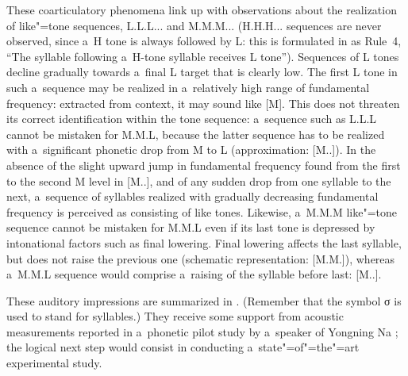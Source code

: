 These coarticulatory phenomena link up with observations about the realization of like"=tone sequences, L.L.L... and
M.M.M... (H.H.H... sequences are never observed, since a~H tone is always followed by L: this is formulated in  as Rule~4, “The syllable following a~H-tone syllable receives L tone”). Sequences
of L tones decline gradually towards a~final L target that is clearly low. The first L tone in such
a~sequence may be realized in a~relatively high range of fundamental frequency: extracted from
context, it may sound like [M]. This does not threaten its correct identification within the tone
sequence: a~sequence such as L.L.L cannot be mistaken for M.M.L, because the latter sequence has to
be realized with a~significant phonetic drop from M to L (approximation:  [M..]). In the absence of
the slight upward jump in fundamental frequency found from the first to the second M level in [M..], and of any sudden drop from one syllable to the
next, a~sequence of syllables realized with gradually decreasing fundamental frequency is perceived as consisting of like tones. Likewise, a~M.M.M like"=tone sequence
cannot be mistaken for M.M.L even if its last tone is depressed by intonational factors such as
final lowering. Final lowering affects the last syllable, but does not raise the previous one
(schematic representation: [M.M.]), whereas a~M.M.L sequence would comprise a~raising
of the syllable before last: [M..].

These auditory impressions are summarized in . (Remember that the symbol σ is used to stand for syllables.) They receive some support from acoustic measurements reported in a~phonetic pilot study by a~speaker of Yongning Na \citep{a2016}; the logical next step would consist in conducting a~state"=of"=the"=art experimental study. 

